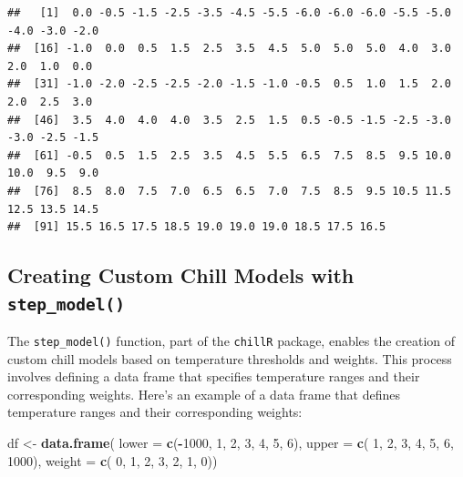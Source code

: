 \documentclass[
]{article}
\newenvironment{Shaded}{\begin{snugshade}}{\end{snugshade}}
\newcommand{\AttributeTok}[1]{\textcolor[rgb]{0.13,0.29,0.53}{#1}}
\newcommand{\DecValTok}[1]{\textcolor[rgb]{0.00,0.00,0.81}{#1}}
\newcommand{\FunctionTok}[1]{\textcolor[rgb]{0.13,0.29,0.53}{\textbf{#1}}}
\newcommand{\NormalTok}[1]{#1}
\newcommand{\OtherTok}[1]{\textcolor[rgb]{0.56,0.35,0.01}{#1}}
\newcommand{\SpecialCharTok}[1]{\textcolor[rgb]{0.81,0.36,0.00}{\textbf{#1}}}
\begin{document}
\begin{Shaded}
\end{Shaded}

\begin{verbatim}
##   [1]  0.0 -0.5 -1.5 -2.5 -3.5 -4.5 -5.5 -6.0 -6.0 -6.0 -5.5 -5.0 -4.0 -3.0 -2.0
##  [16] -1.0  0.0  0.5  1.5  2.5  3.5  4.5  5.0  5.0  5.0  4.0  3.0  2.0  1.0  0.0
##  [31] -1.0 -2.0 -2.5 -2.5 -2.0 -1.5 -1.0 -0.5  0.5  1.0  1.5  2.0  2.0  2.5  3.0
##  [46]  3.5  4.0  4.0  4.0  3.5  2.5  1.5  0.5 -0.5 -1.5 -2.5 -3.0 -3.0 -2.5 -1.5
##  [61] -0.5  0.5  1.5  2.5  3.5  4.5  5.5  6.5  7.5  8.5  9.5 10.0 10.0  9.5  9.0
##  [76]  8.5  8.0  7.5  7.0  6.5  6.5  7.0  7.5  8.5  9.5 10.5 11.5 12.5 13.5 14.5
##  [91] 15.5 16.5 17.5 18.5 19.0 19.0 19.0 18.5 17.5 16.5
\end{verbatim}

\subsection{\texorpdfstring{Creating Custom Chill Models with \texttt{step\_model()}}{Creating Custom Chill Models with step\_model()}}\label{creating-custom-chill-models-with-step_model}

The \texttt{step\_model()} function, part of the \texttt{chillR} package, enables the creation of custom chill models based on temperature thresholds and weights. This process involves defining a data frame that specifies temperature ranges and their corresponding weights. Here's an example of a data frame that defines temperature ranges and their corresponding weights:

\begin{Shaded}
\begin{Highlighting}[]
\NormalTok{df }\OtherTok{\textless{}{-}} \FunctionTok{data.frame}\NormalTok{(}
  \AttributeTok{lower =} \FunctionTok{c}\NormalTok{(}\SpecialCharTok{{-}}\DecValTok{1000}\NormalTok{, }\DecValTok{1}\NormalTok{, }\DecValTok{2}\NormalTok{, }\DecValTok{3}\NormalTok{, }\DecValTok{4}\NormalTok{, }\DecValTok{5}\NormalTok{,    }\DecValTok{6}\NormalTok{),}
  \AttributeTok{upper =} \FunctionTok{c}\NormalTok{(    }\DecValTok{1}\NormalTok{, }\DecValTok{2}\NormalTok{, }\DecValTok{3}\NormalTok{, }\DecValTok{4}\NormalTok{, }\DecValTok{5}\NormalTok{, }\DecValTok{6}\NormalTok{, }\DecValTok{1000}\NormalTok{),}
  \AttributeTok{weight =} \FunctionTok{c}\NormalTok{(   }\DecValTok{0}\NormalTok{, }\DecValTok{1}\NormalTok{, }\DecValTok{2}\NormalTok{, }\DecValTok{3}\NormalTok{, }\DecValTok{2}\NormalTok{, }\DecValTok{1}\NormalTok{,    }\DecValTok{0}\NormalTok{))}
\end{Highlighting}
\end{Shaded}
\end{document}
